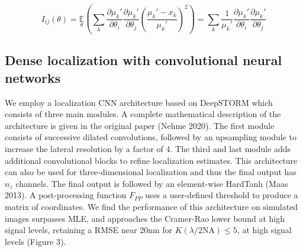 \documentclass{ucetd}
\begin{document}
\begin{equation*}
I_{ij}(\theta) = \underset{\theta}{\mathbb{E}}\left(\sum_{k}\frac{\partial \mu_{k}'}{\partial\theta_{i}}\frac{\partial \mu_{k}'}{\partial\theta_{j}} \left(\frac{\mu_{k}'-x_{k}}{\mu_{k}'}\right)^{2}\right) = \sum_{k}\frac{1}{\mu_{k}'}\frac{\partial \mu_{k}'}{\partial\theta_{i}}\frac{\partial \mu_{k}'}{\partial\theta_{j}}
\end{equation*}

\subsection{Dense localization with convolutional neural networks}

We employ a localization CNN architecture based on DeepSTORM which consists of three main modules. A complete mathematical description of the architecture is given in the original paper (Nehme 2020). The first module consists of successive dilated convolutions, followed by an upsampling module to increase the lateral resolution by a factor of 4. The third and last module adds additional convolutional blocks to refine localization estimates. This architecture can also be used for three-dimensional localization and thus the final output has $n_{z}$ channels. The final output is followed by an element-wise HardTanh (Maas 2013). A post-processing function $F_{PP}$ uses a user-defined threshold to produce a matrix of coordinates. We find the performance of this architecture on simulated images surpasses MLE, and approaches the Cramer-Rao lower bound at high signal levels, retaining a RMSE near 20nm for $K(\lambda/2\mathrm{NA}) \leq 5$, at high signal levels (Figure 3). 
\end{document}
